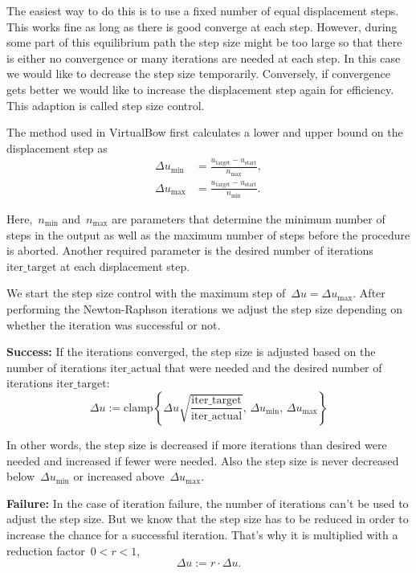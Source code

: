 The easiest way to do this is to use a fixed number of equal displacement steps.
This works fine as long as there is good converge at each step.
However, during some part of this equilibrium path the step size might be too large so that there is either no convergence or many iterations are needed at each step.
In this case we would like to decrease the step size temporarily.
Conversely, if convergence gets better we would like to increase the displacement step again for efficiency.
This adaption is called step size control.

The method used in VirtualBow first calculates a lower and upper bound on the displacement step as
%
\begin{align}
\Delta u_\mathrm{min} &= \frac{u_\mathrm{target} - u_\mathrm{start}}{n_\mathrm{max}}, \\
\Delta u_\mathrm{max} &= \frac{u_\mathrm{target} - u_\mathrm{start}}{n_\mathrm{min}}.
\end{align}

Here,~$n_\mathrm{min}$ and~$n_\mathrm{max}$ are parameters that determine the minimum number of steps in the output as well as the maximum number of steps before the procedure is aborted.
Another required parameter is the desired number of iterations $\mathrm{iter\_target}$ at each displacement step.

We start the step size control with the maximum step of~$\Delta u = \Delta u_\mathrm{max}$.
After performing the Newton-Raphson iterations we adjust the step size depending on whether the iteration was successful or not.

\textbf{Success:} If the iterations converged, the step size is adjusted based on the number of iterations $\mathrm{iter\_actual}$ that were needed and the desired number of iterations $\mathrm{iter\_target}$:
%
$$
\Delta u := \mathrm{clamp} \left\lbrace \Delta u \sqrt{\frac{\mathrm{iter\_target}}{\mathrm{iter\_actual}}},\,\Delta u_\mathrm{min},\,\Delta u_\mathrm{max} \right\rbrace
$$

In other words, the step size is decreased if more iterations than desired were needed and increased if fewer were needed.
Also the step size is never decreased below~$\Delta u_\mathrm{min}$ or increased above~$\Delta u_\mathrm{max}$.

\textbf{Failure:} In the case of iteration failure, the number of iterations can't be used to adjust the step size.
But we know that the step size has to be reduced in order to increase the chance for a successful iteration.
That's why it is multiplied with a reduction factor~$0 < r < 1$,
%
$$
\Delta u := r \cdot \Delta u.
$$

